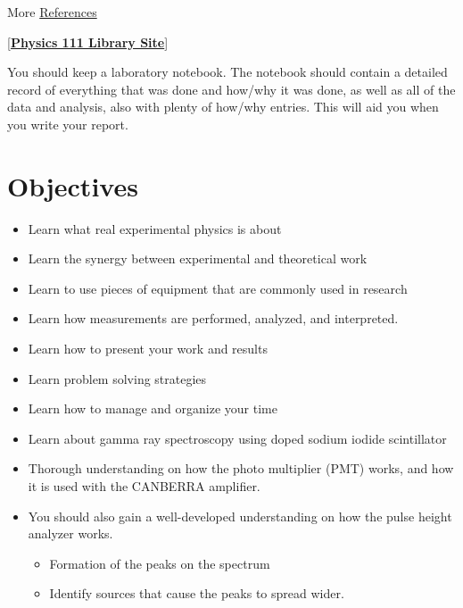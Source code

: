 \documentclass{../lab}
\begin{document}
\noindent More \hyperref[sec:References]{References}

[\href{\LabReprints}{\textbf{Physics 111 Library Site}}]

You should keep a laboratory notebook. The notebook should contain a detailed record of everything that was done and how/why it was done, as well as all of the data and analysis, also with plenty of how/why entries. This will aid you when you write your report.

\section{Objectives}

\begin{itemize}
    \item Learn what real experimental physics is about

    \item Learn the synergy between experimental and theoretical work

    \item Learn to use pieces of equipment that are commonly used in research

    \item Learn how measurements are performed, analyzed, and interpreted.

    \item Learn how to present your work and results

    \item Learn problem solving strategies

    \item Learn how to manage and organize your time

    \item Learn about gamma ray spectroscopy using doped sodium iodide scintillator

    \item Thorough understanding on how the photo multiplier (PMT) works, and how it is used with the CANBERRA amplifier.

    \item You should also gain a well-developed understanding on how the pulse height analyzer works.

    \begin{itemize}
        \item Formation of the peaks on the spectrum

        \item Identify sources that cause the peaks to spread wider.


\end{itemize}
\end{itemize}
\end{document}
